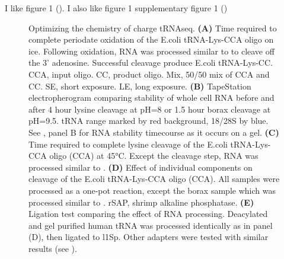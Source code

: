 \documentclass[9pt,lineno]{elife}
\begin{document}
I like figure 1 ().
I also like figure 1 supplementary figure 1 ()





\begin{figure}[ht!]
\centering
{}
\caption{
Optimizing the chemistry of charge tRNAseq.
\textbf{(A)} Time required to complete periodate oxidation of the E.coli tRNA-Lys-CCA oligo on ice.
Following oxidation, RNA was processed similar to \cite{Evans2017-st} to cleave off the 3' adenosine.
Successful cleavage produce E.coli tRNA-Lys-CC.
CCA, input oligo.
CC, product oligo.
Mix, 50/50 mix of CCA and CC.
SE, short exposure.
LE, long exposure.
\textbf{(B)} TapeStation electropherogram comparing stability of whole cell RNA before and after 4 hour lysine cleavage at pH=8 or 1.5 hour borax cleavage at pH=9.5.
tRNA range marked by red background, 18/28S by blue.
See , panel B for RNA stability timecourse as it occurs on a gel.
\textbf{(C)} Time required to complete lysine cleavage of the E.coli tRNA-Lys-CCA oligo (CCA) at 45°C.
Except the cleavage step, RNA was processed similar to \cite{Evans2017-st}.
\textbf{(D)} Effect of individual components on cleavage of the E.coli tRNA-Lys-CCA oligo (CCA).
All samples were processed as a one-pot reaction, except the borax sample which was processed similar to \cite{Evans2017-st}.
rSAP, shrimp alkaline phosphatase.
\textbf{(E)} Ligation test comparing the effect of RNA processing.
Deacylated and gel purified human tRNA was processed identically as in panel (D), then ligated to l1Sp.
Other adapters were tested with similar results (see ).
}
\label{fig:Fig2}


\end{figure}
\end{document}
